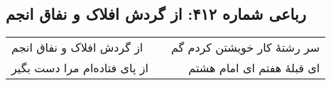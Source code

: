 \begin{center}
\section*{رباعی شماره ۴۱۲: از گردش افلاک و نفاق انجم}
\label{sec:sh412}
\begin{longtable}{l p{0.5cm} r}
از گردش افلاک و نفاق انجم
&&
سر رشتهٔ کار خویشتن کردم گم
\\
از پای فتاده‌ام مرا دست بگیر
&&
ای قبلهٔ هفتم ای امام هشتم
\\
\end{longtable}
\end{center}
